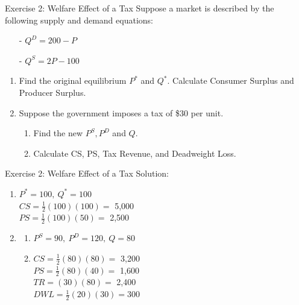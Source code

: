 \documentclass[9pt, handout]{beamer}
\begin{document}
\begin{frame}{Exercise 2: Welfare Effect of a Tax}
    Suppose a market is described by the following supply and demand equations:
    \begin{itemize}
        \item[-] $Q^D = 200-P$
        \item[-] $Q^S = 2P-100$
    \end{itemize}
    \begin{enumerate}
        \item Find the original equilibrium $P^*$ and $Q^*$.  Calculate Consumer Surplus and Producer Surplus.
        \vspace{5pt}
        \item Suppose the government imposes a tax of \$30 per unit.  
        \vspace{5pt}
        \begin{enumerate}[a]
            \item Find the new $P^S, P^D$ and $Q$.
            \vspace{5pt}
            \item Calculate CS, PS, Tax Revenue, and Deadweight Loss.
        \end{enumerate}
    \end{enumerate}
    \vspace{1in}
\end{frame}

\begin{frame}{Exercise 2: Welfare Effect of a Tax}
Solution:
    \begin{enumerate}
        \item $P^* = 100, \: Q^* = 100$\\
        \vspace{5pt}
        $CS = \frac{1}{2}(100)(100) =$ 5,000\\
        \vspace{5pt}
        $PS = \frac{1}{2}(100)(50) =$ 2,500
        \item 
        \vspace{5pt}
        \begin{enumerate}[a]
            \item $P^S = 90, \: P^D = 120, \: Q = 80$
            \vspace{5pt}
            \item $CS = \frac{1}{2}(80)(80) =$ 3,200\\
            \vspace{5pt}
            $PS = \frac{1}{2}(80)(40) =$ 1,600\\
            \vspace{5pt}
            $TR = (30)(80) =$ 2,400\\
            \vspace{5pt}
            $DWL = \frac{1}{2}(20)(30) = 300$
        \end{enumerate}
    \end{enumerate}
\end{frame}
\end{document}
